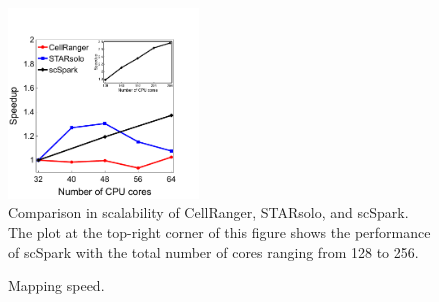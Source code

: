 \documentclass[conference]{IEEEtran}
\begin{document}
\begin{figure}
	\centering
	\includegraphics[width=0.45\textwidth]{fig3.pdf}
	\caption{Comparison in scalability of CellRanger, STARsolo, and scSpark. The plot at the top-right corner of this figure shows the performance of scSpark with the total number of cores ranging from 128 to 256.}
	\label{fig3}
\end{figure}
\begin{figure}
	\centering
	\caption{Mapping speed.}
	\label{fig4}
\end{figure}
\end{document}
